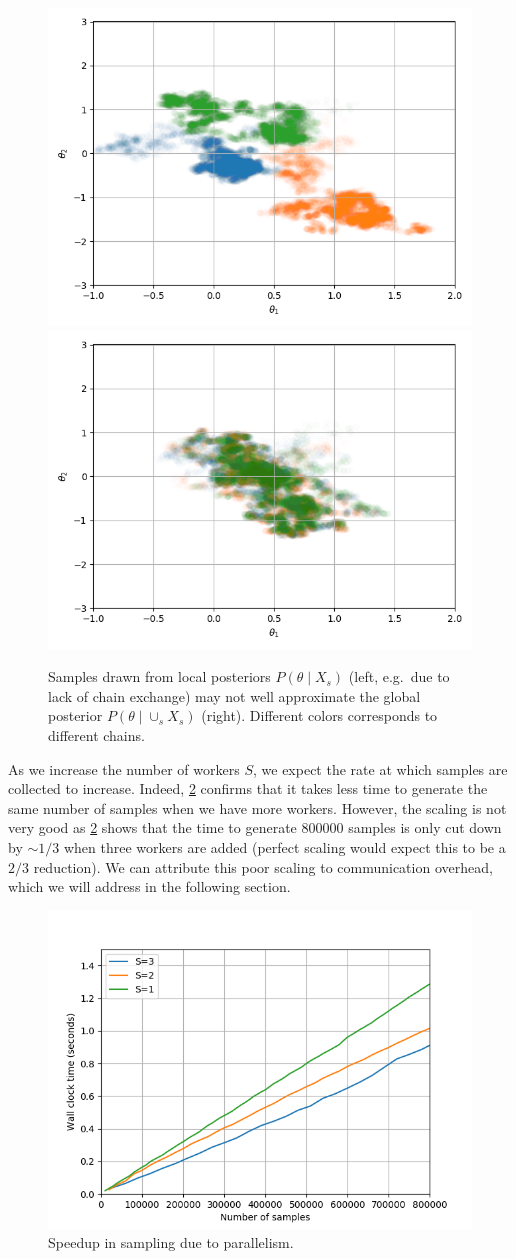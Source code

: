 \documentclass{article}
\begin{document}
\begin{figure}[htbp]
  \centering
  \includegraphics[width=0.49\linewidth]{poster-figures/gaussian_no_exchange.png}
  \includegraphics[width=0.49\linewidth]{poster-figures/gaussian_exchange.png}
  \caption{Samples drawn from local posteriors $P(\theta \mid X_s)$ (left, e.g.\ due to lack
    of chain exchange) may not well approximate the global posterior
    $P(\theta \mid \cup_s X_s)$ (right). Different colors corresponds to different chains.}
  \label{fig:samples}
\end{figure}

As we increase the number of workers $S$, we expect the rate at which samples are collected to increase.
Indeed, \cref{fig:speedup-partitioning} confirms that it takes less time to generate the same number
of samples when we have more workers. However, the scaling is not very good as
\cref{fig:speedup-partitioning} shows that the time to generate $800000$ samples is only cut down by
$\sim 1/3$ when three workers are added (perfect scaling would expect this to be a $2/3$ reduction).
We can attribute this poor scaling to communication overhead, which we will address in the following section.

\begin{figure}[htbp]
  \centering
  \includegraphics[width=0.5\linewidth]{poster-figures/speedup-parallel.png}
  \caption{Speedup in sampling due to parallelism.}
  \label{fig:speedup-partitioning}
\end{figure}
\end{document}
